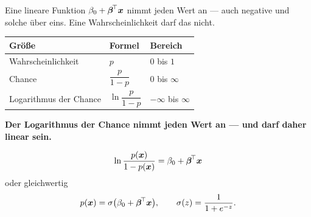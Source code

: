 \begin{merksatz}
Eine lineare Funktion $\beta_0 + \boldsymbol{\beta}^{\!\top}\boldsymbol{x}$ nimmt jeden Wert an --- auch negative und solche über eins. Eine Wahrscheinlichkeit darf das nicht.

\begin{center}
{\small
\renewcommand{\arraystretch}{1.5}
\begin{tabular}{@{}P{3.0cm}P{2.4cm}P{2.4cm}@{}}
\toprule
\textbf{Größe} & \textbf{Formel} & \textbf{Bereich}\\
\midrule
Wahrscheinlichkeit & $p$ & $0$ bis $1$\\
Chance & $\dfrac{p}{1-p}$ & $0$ bis $\infty$\\
Logarithmus der Chance & $\ln\dfrac{p}{1-p}$ & $-\infty$ bis $\infty$\\
\bottomrule
\end{tabular}}
\end{center}

\begin{center}
\begin{minipage}{0.9\textwidth}
\textbf{Der Logarithmus der Chance nimmt jeden Wert an --- und darf daher linear sein.}
\end{minipage}
\end{center}
\end{merksatz}

\begin{definition}
\[ \ln\frac{p(\boldsymbol{x})}{1-p(\boldsymbol{x})} = \beta_0 + \boldsymbol{\beta}^{\!\top}\boldsymbol{x} \]
oder gleichwertig
\[ p(\boldsymbol{x}) = \sigma\bigl(\beta_0 + \boldsymbol{\beta}^{\!\top}\boldsymbol{x}\bigr), \qquad \sigma(z) = \frac{1}{1+e^{-z}} . \]
\end{definition}

